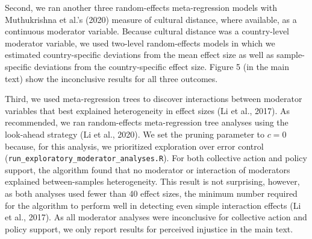 \documentclass[12pt, letterpaper]{article}
\begin{document}
Second, we ran another three random-effects meta-regression models with
Muthukrishna et al.'s (2020) measure of cultural distance, where
available, as a continuous moderator variable. Because cultural distance
was a country-level moderator variable, we used two-level random-effects
models in which we estimated country-specific deviations from the mean
effect size as well as sample-specific deviations from the
country-specific effect size. Figure 5 (in the main text) show the
inconclusive results for all three outcomes.

Third, we used meta-regression trees to discover interactions between
moderator variables that best explained heterogeneity in effect sizes
(Li et al., 2017). As recommended, we ran random-effects meta-regression
tree analyses using the look-ahead strategy (Li et al., 2020). We set
the pruning parameter to \(c = 0\) because, for this analysis, we
prioritized exploration over error control
(\texttt{run\_exploratory\_moderator\_analyses.R}). For both collective
action and policy support, the algorithm found that no moderator or
interaction of moderators explained between-samples heterogeneity. This
result is not surprising, however, as both analyses used fewer than 40
effect sizes, the minimum number required for the algorithm to perform
well in detecting even simple interaction effects (Li et al., 2017). As
all moderator analyses were inconclusive for collective action and
policy support, we only report results for perceived injustice in the
main text.
\end{document}
